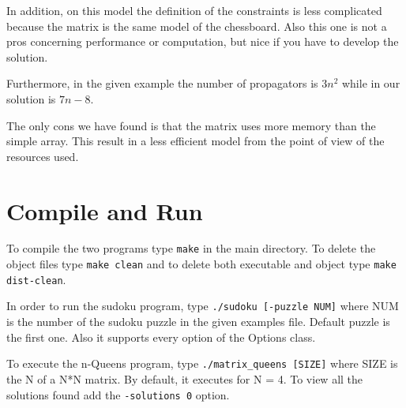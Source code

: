 \documentclass[a4paper, 11pt]{article}
\begin{document}
In addition, on this model the definition of the constraints is less
complicated because the matrix is the same model of the
chessboard. Also this one is not a pros concerning performance or
computation, but nice if you have to develop the solution.

Furthermore, in the given example the number of propagators is
$3n^{2}$ while in our solution is $7n-8$.

The only cons we have found is that the matrix uses more memory than
the simple array. This result in a less efficient model from the point
of view of the resources used.

\section{Compile and Run}

To compile the two programs type \texttt{make} in the main
directory. To delete the object files type \texttt{make clean} and to
delete both executable and object type \texttt{make dist-clean}.
	
In order to run the sudoku program, type \texttt{./sudoku [-puzzle
  NUM]} where NUM is the number of the sudoku puzzle in the given
examples file. Default puzzle is the first one. Also it supports every
option of the Options class.

To execute the n-Queens program, type \texttt{./matrix\_queens [SIZE]}
where SIZE is the N of a N*N matrix. By default, it executes for N =
4. To view all the solutions found add the \texttt{-solutions 0} option.
\end{document}
